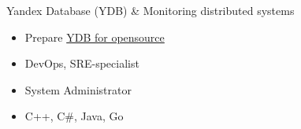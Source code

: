 \documentclass[10pt,a4paper,ragged2e]{altacv}
\begin{document}
Yandex Database (YDB) \& Monitoring distributed systems
\begin{itemize}
    \item Prepare \href{https://github.com/ydb-platform/ydb}{YDB for opensource}
    \item DevOps, SRE-specialist
    \item System Administrator
    \item C++, C\#, Java, Go
\end{itemize}
\bigskip




\end{document}
